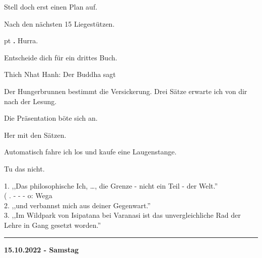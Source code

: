 \documentclass[10pt,a4paper]{article}
\newcounter{notec}
\newcommand\notep[1]{%
  \stepcounter{notec}
  \vskip #1pt
  {\bf\arabic{notec}.}
}
\newcommand\rele[1] {{\color {english} \bf {#1}}}              %
\newcommand\ddivide {\vskip -9pt \hrule \vskip 6pt}
\begin{document}
\begin{mdframed}[style=daystyle]
  \vskip 2pt
  Stell doch erst einen Plan auf.

  \vskip 2pt
  Nach den nächsten 15 Liegestützen.


  \notep 4 Hurra.

  \vskip 2pt
  Entscheide dich für ein drittes Buch.

  \vskip 2pt
  Thich Nhat Hanh: Der Buddha sagt

  \vskip 2pt
  Der Hungerbrunnen bestimmt die Versickerung. Drei Sätze erwarte ich von dir
  nach der Lesung.

  \vskip 2pt
  Die Präsentation böte sich an.

  \vskip 2pt
  Her mit den Sätzen.

  \vskip 2pt
  Automatisch fahre ich los und kaufe eine Laugenstange.

  \vskip 2pt
  Tu das nicht.

  \vskip 2pt
  1. ,,Das philosophische Ich, …, die Grenze - nicht ein Teil - der Welt.'' \\
  ( . - - - o: Wega \\
  2. ,,und verbannst mich aus deiner Gegenwart.'' \\
  3. ,,Im Wildpark von Isipatana bei Varanasi ist das unvergleichliche Rad der
  Lehre in Gang gesetzt worden.''

\end{mdframed}


\ddivide
{\rele {15.10.2022 - Samstag}}
       
\end{document}
